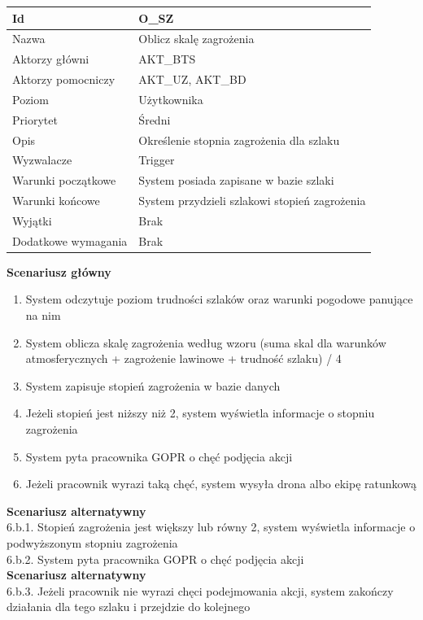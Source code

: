 \documentclass[a4paper,12pt]{article}
\begin{document}
\newpage
\begin{longtable}{| p{5cm} | p{10cm} |}
\hline
Id & O\_SZ \\\hline
Nazwa & Oblicz skalę zagrożenia \\\hline
Aktorzy główni & AKT\_BTS \\\hline
Aktorzy pomocniczy & AKT\_UZ, AKT\_BD \\\hline
Poziom & Użytkownika \\\hline
Priorytet & Średni \\\hline
Opis & Określenie stopnia zagrożenia dla szlaku \\\hline
Wyzwalacze & Trigger \\\hline
Warunki początkowe & System posiada zapisane w bazie szlaki \\\hline
Warunki końcowe & System przydzieli szlakowi stopień zagrożenia \\\hline
Wyjątki & Brak \\\hline
Dodatkowe wymagania & Brak \\\hline
\end{longtable}
\textbf{Scenariusz główny}
\begin{enumerate}
\item System odczytuje poziom trudności szlaków oraz warunki pogodowe panujące na nim
\item System oblicza skalę zagrożenia według wzoru (suma skal dla warunków atmosferycznych + zagrożenie lawinowe + trudność szlaku) / 4
\item System zapisuje stopień zagrożenia w bazie danych
\item Jeżeli stopień jest niższy niż 2, system wyświetla informacje o stopniu zagrożenia
\item System pyta pracownika GOPR o chęć podjęcia akcji
\item Jeżeli pracownik wyrazi taką chęć, system wysyła drona albo ekipę ratunkową
\end{enumerate}
\textbf{Scenariusz alternatywny}\\
6.b.1. Stopień zagrożenia jest większy lub równy 2, system wyświetla informacje o podwyższonym stopniu zagrożenia\\
6.b.2. System pyta pracownika GOPR o chęć podjęcia akcji\\
\textbf{Scenariusz alternatywny}\\
6.b.3.	Jeżeli pracownik nie wyrazi chęci podejmowania akcji, system zakończy działania dla tego szlaku i przejdzie do kolejnego
\end{document}
